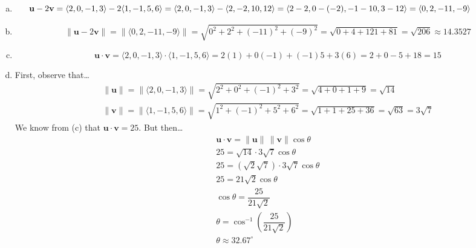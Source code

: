 \documentclass[11pt,letterpaper]{article}
\begin{document}
\sol 
\begin{enumerate}[(a)]
\item 
	\[
	\hspace{-1.5cm} \mathbf{u} - 2 \mathbf{v}= \langle 2, 0, -1, 3 \rangle - 2 \langle 1, -1, 5, 6 \rangle= \langle 2, 0, -1, 3 \rangle - \langle 2, -2, 10, 12 \rangle= \langle 2 - 2, 0 - (-2), -1 - 10, 3 - 12 \rangle= \langle 0, 2, -11, -9 \rangle
	\] \pspace

\item 
	\[
	\| \mathbf{u} - 2\mathbf{v} \|= \| \langle 0, 2, -11, -9 \rangle \|= \sqrt{0^2 + 2^2 + (-11)^2 + (-9)^2}= \sqrt{0 + 4 + 121 + 81}= \sqrt{206} \approx 14.3527
	\] \pspace

\item 
	\[
	\mathbf{u} \cdot \mathbf{v}= \langle 2, 0, -1, 3 \rangle \cdot \langle 1, -1, 5, 6 \rangle= 2(1) + 0(-1) + (-1)5 + 3(6)= 2 + 0 - 5 + 18= 15
	\] \pspace

\item First, observe that\dots
	\[
	\begin{aligned}
	\| \mathbf{u} \|= \| \langle 2, 0, -1, 3 \rangle \|= \sqrt{2^2 + 0^2 + (-1)^2 + 3^2}= \sqrt{4 + 0 + 1 + 9}= \sqrt{14} \\
	\| \mathbf{v} \|= \| \langle 1, -1, 5, 6 \rangle \|= \sqrt{1^2 + (-1)^2 + 5^2 + 6^2}= \sqrt{1 + 1 + 25 + 36}= \sqrt{63}= 3 \sqrt{7}
	\end{aligned}
	\]
We know from (c) that $\mathbf{u} \cdot \mathbf{v}= 25$. But then\dots
	\[
	\begin{gathered}
	\mathbf{u} \cdot \mathbf{v}= \| \mathbf{u} \| \, \| \mathbf{v} \| \cos \theta \\[0.3cm]
	25= \sqrt{14} \cdot 3 \sqrt{7} \cos \theta \\[0.3cm]
	25= (\sqrt{2} \sqrt{7}) \cdot 3 \sqrt{7} \cos \theta \\[0.3cm]
	25= 21 \sqrt{2} \cos \theta \\[0.3cm]
	\cos \theta= \dfrac{25}{21 \sqrt{2}} \\[0.3cm]
	\theta= \cos^{-1} \left( \dfrac{25}{21 \sqrt{2}} \right) \\[0.3cm]
	\theta \approx 32.67^\circ
	\end{gathered}
	\]
\end{enumerate}



\newpage
\end{document}
